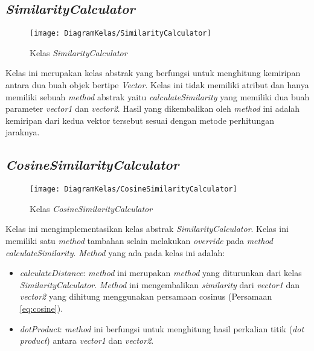 \subsection{\textit{SimilarityCalculator}}

\begin{figure}[H]
	\begin{center}
		\texttt{[image: DiagramKelas/SimilarityCalculator]}
		\caption{Kelas \textit{SimilarityCalculator}}
		\label{fig:kelasSimilarityCalculator}
	\end{center}
\end{figure}

Kelas ini merupakan kelas abstrak yang berfungsi untuk menghitung kemiripan antara dua buah objek bertipe \textit{Vector}. Kelas ini tidak memiliki atribut dan hanya memiliki sebuah \textit{method} abstrak yaitu \textit{calculateSimilarity} yang memiliki dua buah parameter \textit{vector1} dan \textit{vector2}. Hasil yang dikembalikan oleh \textit{method} ini adalah kemiripan dari kedua vektor tersebut sesuai dengan metode perhitungan jaraknya.

\subsection{\textit{CosineSimilarityCalculator}}

\begin{figure}[H]
	\begin{center}
		\texttt{[image: DiagramKelas/CosineSimilarityCalculator]}
		\caption{Kelas \textit{CosineSimilarityCalculator}}
		\label{fig:kelasCosineDist}
	\end{center}
\end{figure}

Kelas ini mengimplementasikan kelas abstrak \textit{SimilarityCalculator}. Kelas ini memiliki satu \textit{method} tambahan selain melakukan \textit{override} pada \textit{method calculateSimilarity}. \textit{Method} yang ada pada kelas ini adalah:

\begin{itemize}
	\item \textit{calculateDistance}: \textit{method} ini merupakan \textit{method} yang diturunkan dari kelas \textit{SimilarityCalculator}. \textit{Method} ini mengembalikan \textit{similarity} dari \textit{vector1} dan \textit{vector2} yang dihitung menggunakan persamaan cosinus (Persamaan \ref{eq:cosine}).
	\item \textit{dotProduct}: \textit{method} ini berfungsi untuk menghitung hasil perkalian titik (\textit{dot product}) antara \textit{vector1} dan \textit{vector2}.
\end{itemize}

